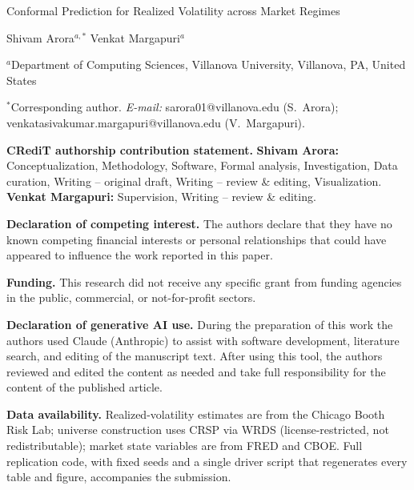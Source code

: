 \documentclass[11pt]{article}
\begin{document}
\thispagestyle{empty}

\begin{center}
{\LARGE Conformal Prediction for Realized Volatility across Market
Regimes}

\vspace{2em}
{\large Shivam Arora$^{a,*}$ \quad Venkat Margapuri$^{a}$}

\vspace{1em}
$^{a}$Department of Computing Sciences, Villanova University,
Villanova, PA, United States

\vspace{0.5em}
$^{*}$Corresponding author. \textit{E-mail:} sarora01@villanova.edu
(S.~Arora); venkatasivakumar.margapuri@villanova.edu (V.~Margapuri).
\end{center}

\vspace{2em}
\noindent\textbf{CRediT authorship contribution statement.}
\textbf{Shivam Arora:} Conceptualization, Methodology, Software, Formal
analysis, Investigation, Data curation, Writing -- original draft,
Writing -- review \& editing, Visualization.
\textbf{Venkat Margapuri:} Supervision, Writing -- review \& editing.

\vspace{1em}
\noindent\textbf{Declaration of competing interest.}
The authors declare that they have no known competing financial
interests or personal relationships that could have appeared to
influence the work reported in this paper.

\vspace{1em}
\noindent\textbf{Funding.}
This research did not receive any specific grant from funding agencies
in the public, commercial, or not-for-profit sectors.

\vspace{1em}
\noindent\textbf{Declaration of generative AI use.}
During the preparation of this work the authors used Claude (Anthropic)
to assist with software development, literature search, and editing of
the manuscript text. After using this tool, the authors reviewed and
edited the content as needed and take full responsibility for the
content of the published article.

\vspace{1em}
\noindent\textbf{Data availability.}
Realized-volatility estimates are from the Chicago Booth Risk Lab;
universe construction uses CRSP via WRDS (license-restricted, not
redistributable); market state variables are from FRED and CBOE. Full
replication code, with fixed seeds and a single driver script that
regenerates every table and figure, accompanies the submission.
\end{document}
